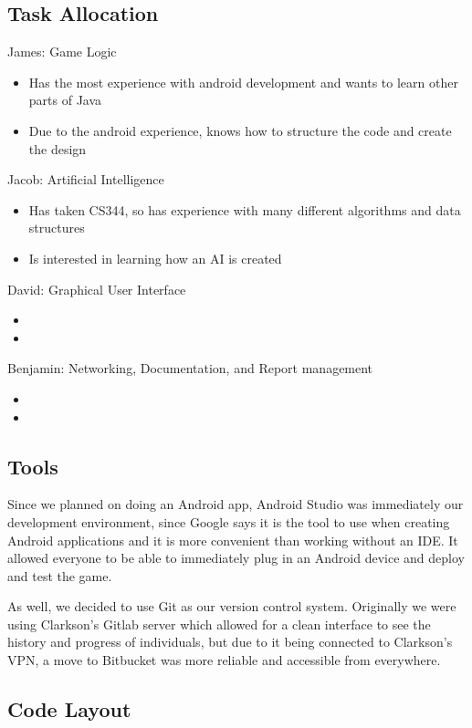 \documentclass{article}
\begin{document}
\subsection{Task Allocation}
James: Game Logic
\begin{itemize}
  \item Has the most experience with android development and wants to learn other parts of Java
  \item Due to the android experience, knows how to structure the code and create the design
\end{itemize}
Jacob: Artificial Intelligence
\begin{itemize}
  \item Has taken CS344, so has experience with many different algorithms and data structures
  \item Is interested in learning how an AI is created
\end{itemize}
David: Graphical User Interface
\begin{itemize}
  \item 
  \item 
\end{itemize}
Benjamin: Networking, Documentation, and Report management
\begin{itemize}
  \item 
  \item 
\end{itemize}

\subsection{Tools}
Since we planned on doing an Android app, Android Studio was immediately our development environment, since Google says it is the tool to use when creating Android applications and it is more convenient than working without an IDE. It allowed everyone to be able to immediately plug in an Android device and deploy and test the game.\par 
	As well, we decided to use Git as our version control system. Originally we were using Clarkson's Gitlab server which allowed for a clean interface to see the history and progress of individuals, but due to it being connected to Clarkson's VPN, a move to Bitbucket was more reliable and accessible from everywhere.

\subsection{Code Layout}
\end{document}
